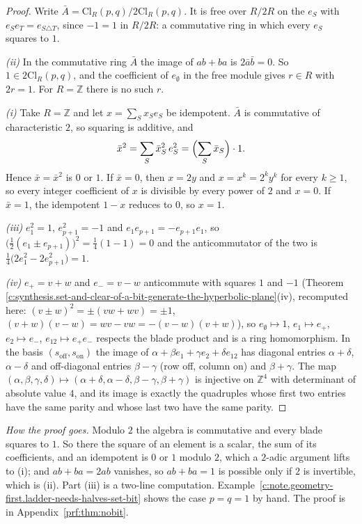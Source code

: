 \documentclass[11pt]{article}
\theoremstyle{definition}
\theoremstyle{plain}
\providecommand{\Cl}{}\renewcommand{\Cl}{\mathrm{Cl}}
\providecommand{\Z}{}\renewcommand{\Z}{\mathbb{Z}}
\begin{document}
\begin{proof}
Write $\bar{A} = \Cl_{R}(p,q)/2\Cl_{R}(p,q)$. It is free over $R/2R$ on the $e_{S}$ with $e_{S}e_{T} = e_{S \triangle T}$, since $-1 = 1$ in $R/2R$: a commutative ring in which every $e_{S}$ squares to $1$.

\emph{(ii)} In the commutative ring $\bar{A}$ the image of $ab + ba$ is $2\bar{a}\bar{b} = 0$. So $1 \in 2\Cl_{R}(p,q)$, and the coefficient of $e_{\emptyset}$ in the free module gives $r \in R$ with $2r = 1$. For $R = \Z$ there is no such $r$.

\emph{(i)} Take $R = \Z$ and let $x = \sum_{S} x_{S}e_{S}$ be idempotent. $\bar{A}$ is commutative of characteristic $2$, so squaring is additive, and
\[
\bar{x}^{2} = \sum_{S} \bar{x}_{S}^{2}\,e_{S}^{2} = \Bigl(\sum_{S} \bar{x}_{S}\Bigr)\cdot 1 .
\]
Hence $\bar{x} = \bar{x}^{2}$ is $0$ or $1$. If $\bar{x} = 0$, then $x = 2y$ and $x = x^{k} = 2^{k}y^{k}$ for every $k \ge 1$, so every integer coefficient of $x$ is divisible by every power of $2$ and $x = 0$. If $\bar{x} = 1$, the idempotent $1 - x$ reduces to $0$, so $x = 1$.

\emph{(iii)} $e_{1}^{2} = 1$, $e_{p+1}^{2} = -1$ and $e_{1}e_{p+1} = -e_{p+1}e_{1}$, so $\bigl(\tfrac12(e_{1} \pm e_{p+1})\bigr)^{2} = \tfrac14(1 - 1) = 0$ and the anticommutator of the two is $\tfrac14\bigl(2e_{1}^{2} - 2e_{p+1}^{2}\bigr) = 1$.

\emph{(iv)} $e_{+} = v + w$ and $e_{-} = v - w$ anticommute with squares $1$ and $-1$ (Theorem \ref{c:synthesis.set-and-clear-of-a-bit-generate-the-hyperbolic-plane}(iv), recomputed here: $(v \pm w)^{2} = \pm(vw + wv) = \pm 1$, $(v + w)(v - w) = wv - vw = -(v - w)(v + w)$), so $e_{\emptyset} \mapsto 1$, $e_{1} \mapsto e_{+}$, $e_{2} \mapsto e_{-}$, $e_{12} \mapsto e_{+}e_{-}$ respects the blade product and is a ring homomorphism. In the basis $(s_{\mathrm{off}}, s_{\mathrm{on}})$ the image of $\alpha + \beta e_{1} + \gamma e_{2} + \delta e_{12}$ has diagonal entries $\alpha + \delta$, $\alpha - \delta$ and off-diagonal entries $\beta - \gamma$ (row off, column on) and $\beta + \gamma$. The map $(\alpha, \beta, \gamma, \delta) \mapsto (\alpha + \delta, \alpha - \delta, \beta - \gamma, \beta + \gamma)$ is injective on $\Z^{4}$ with determinant of absolute value $4$, and its image is exactly the quadruples whose first two entries have the same parity and whose last two have the same parity.

\end{proof}

\label{c:note.geometry-first.setting-switch-what-bit-does-5}
\noindent\emph{How the proof goes.} Modulo $2$ the algebra is commutative and every blade squares to $1$. So there the square of an element is a scalar, the sum of its coefficients, and an idempotent is $0$ or $1$ modulo $2$, which a $2$-adic argument lifts to (i); and $ab + ba = 2ab$ vanishes, so $ab + ba = 1$ is possible only if $2$ is invertible, which is (ii). Part (iii) is a two-line computation. Example~\ref{c:note.geometry-first.ladder-needs-halves-set-bit} shows the case $p = q = 1$ by hand. The proof is in Appendix~\ref{prf:thm:nobit}.
\end{document}
